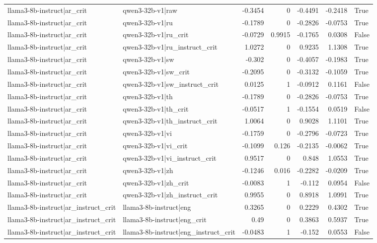 \begin{table}
\begin{tabular}{l l r r r r l}
llama3-8b-instruct|ar_crit & qwen3-32b-v1|raw & -0.3454 & 0 & -0.4491 & -0.2418 & True \\
llama3-8b-instruct|ar_crit & qwen3-32b-v1|ru & -0.1789 & 0 & -0.2826 & -0.0753 & True \\
llama3-8b-instruct|ar_crit & qwen3-32b-v1|ru_crit & -0.0729 & 0.9915 & -0.1765 & 0.0308 & False \\
llama3-8b-instruct|ar_crit & qwen3-32b-v1|ru_instruct_crit & 1.0272 & 0 & 0.9235 & 1.1308 & True \\
llama3-8b-instruct|ar_crit & qwen3-32b-v1|sw & -0.302 & 0 & -0.4057 & -0.1983 & True \\
llama3-8b-instruct|ar_crit & qwen3-32b-v1|sw_crit & -0.2095 & 0 & -0.3132 & -0.1059 & True \\
llama3-8b-instruct|ar_crit & qwen3-32b-v1|sw_instruct_crit & 0.0125 & 1 & -0.0912 & 0.1161 & False \\
llama3-8b-instruct|ar_crit & qwen3-32b-v1|th & -0.1789 & 0 & -0.2826 & -0.0753 & True \\
llama3-8b-instruct|ar_crit & qwen3-32b-v1|th_crit & -0.0517 & 1 & -0.1554 & 0.0519 & False \\
llama3-8b-instruct|ar_crit & qwen3-32b-v1|th_instruct_crit & 1.0064 & 0 & 0.9028 & 1.1101 & True \\
llama3-8b-instruct|ar_crit & qwen3-32b-v1|vi & -0.1759 & 0 & -0.2796 & -0.0723 & True \\
llama3-8b-instruct|ar_crit & qwen3-32b-v1|vi_crit & -0.1099 & 0.126 & -0.2135 & -0.0062 & True \\
llama3-8b-instruct|ar_crit & qwen3-32b-v1|vi_instruct_crit & 0.9517 & 0 & 0.848 & 1.0553 & True \\
llama3-8b-instruct|ar_crit & qwen3-32b-v1|zh & -0.1246 & 0.016 & -0.2282 & -0.0209 & True \\
llama3-8b-instruct|ar_crit & qwen3-32b-v1|zh_crit & -0.0083 & 1 & -0.112 & 0.0954 & False \\
llama3-8b-instruct|ar_crit & qwen3-32b-v1|zh_instruct_crit & 0.9955 & 0 & 0.8918 & 1.0991 & True \\
llama3-8b-instruct|ar_instruct_crit & llama3-8b-instruct|eng & 0.3265 & 0 & 0.2229 & 0.4302 & True \\
llama3-8b-instruct|ar_instruct_crit & llama3-8b-instruct|eng_crit & 0.49 & 0 & 0.3863 & 0.5937 & True \\
llama3-8b-instruct|ar_instruct_crit & llama3-8b-instruct|eng_instruct_crit & -0.0483 & 1 & -0.152 & 0.0553 & False \\

\end{tabular}
\end{table}
